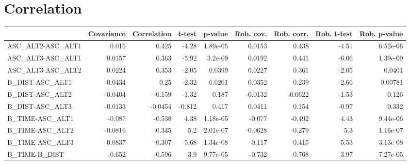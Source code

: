 \section{Correlation}
\begin{tabular}{lrrrrrrrr}
\toprule
{} &  Covariance &  Correlation &  t-test &  p-value &  Rob. cov. &  Rob. corr. &  Rob. t-test &  Rob. p-value \\
\midrule
ASC\_ALT2-ASC\_ALT1 &       0.016 &        0.425 &   -4.28 & 1.89e-05 &     0.0153 &       0.438 &        -4.51 &      6.52e-06 \\
ASC\_ALT3-ASC\_ALT1 &      0.0157 &        0.363 &   -5.92 &  3.2e-09 &     0.0192 &       0.441 &        -6.06 &      1.39e-09 \\
ASC\_ALT3-ASC\_ALT2 &      0.0224 &        0.353 &   -2.05 &   0.0399 &     0.0227 &       0.361 &        -2.05 &        0.0401 \\
B\_DIST-ASC\_ALT1   &      0.0434 &         0.25 &   -2.32 &   0.0201 &     0.0352 &       0.239 &        -2.66 &       0.00781 \\
B\_DIST-ASC\_ALT2   &     -0.0404 &       -0.159 &   -1.32 &    0.187 &    -0.0132 &     -0.0622 &        -1.53 &         0.126 \\
B\_DIST-ASC\_ALT3   &     -0.0133 &      -0.0454 &  -0.812 &    0.417 &     0.0411 &       0.154 &        -0.97 &         0.332 \\
B\_TIME-ASC\_ALT1   &      -0.087 &       -0.538 &    4.38 & 1.18e-05 &     -0.077 &      -0.492 &         4.43 &      9.44e-06 \\
B\_TIME-ASC\_ALT2   &     -0.0816 &       -0.345 &     5.2 & 2.01e-07 &    -0.0628 &      -0.279 &          5.3 &      1.16e-07 \\
B\_TIME-ASC\_ALT3   &     -0.0837 &       -0.307 &    5.68 & 1.34e-08 &     -0.117 &      -0.415 &         5.53 &      3.13e-08 \\
B\_TIME-B\_DIST     &      -0.652 &       -0.596 &     3.9 & 9.77e-05 &     -0.732 &      -0.768 &         3.97 &      7.27e-05 \\
\bottomrule
\end{tabular}
